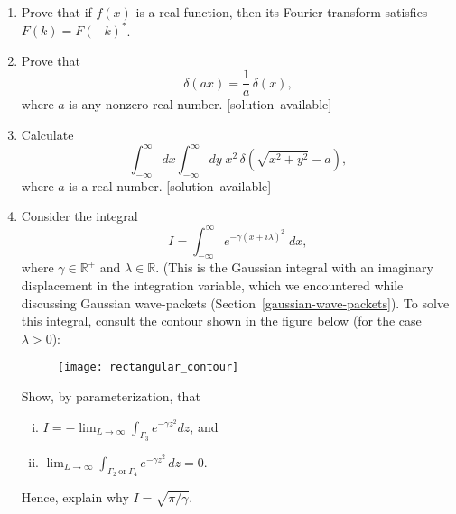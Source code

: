 \documentclass[10pt,a4paper]{article}
\begin{document}
\begin{enumerate}
\item
  Prove that if $f(x)$ is a real function, then its Fourier transform
  satisfies $F(k) = F(-k)^*$.

\item
  Prove that
  \begin{equation}
    \delta(ax) = \frac{1}{a}\,\delta(x),
  \end{equation}
  where $a$ is any nonzero real number.
  \hfill{\scriptsize [solution~available]}

\item Calculate
  \begin{equation}
    \int_{-\infty}^\infty dx \int_{-\infty}^\infty dy \;
    x^2\, \delta\left(\sqrt{x^2+y^2}-a\right),
  \end{equation}
  where $a$ is a real number.
  \hfill{\scriptsize [solution~available]}
  
\item
  Consider the integral $$I = \int_{-\infty}^\infty e^{-\gamma\left(x
    + i\lambda\right)^2} \; dx,$$ where $\gamma \in \mathbb{R}^+$ and
  $\lambda \in \mathbb{R}.$ (This is the Gaussian integral with an
  imaginary displacement in the integration variable, which we
  encountered while discussing Gaussian wave-packets
  (Section~\ref{gaussian-wave-packets}).  To solve this integral,
  consult the contour shown in the figure below (for the case $\lambda
  > 0$):

  \begin{figure}[ht]
    \centering\texttt{[image: rectangular\_contour]}
  \end{figure}

  Show, by parameterization, that
  \begin{enumerate}[(i)]
  \item $\displaystyle I = - \lim_{L\rightarrow \infty} \int_{\Gamma_3} e^{-\gamma
    z^2} dz$, and
  \item $\displaystyle \lim_{L\rightarrow \infty} \int_{\Gamma_2~\text{or}~\Gamma_4}
  e^{-\gamma z^2}\, dz = 0.$
  \end{enumerate}
  Hence, explain why $I = \sqrt{\pi/\gamma}.$

\end{enumerate}
    
\end{document}
